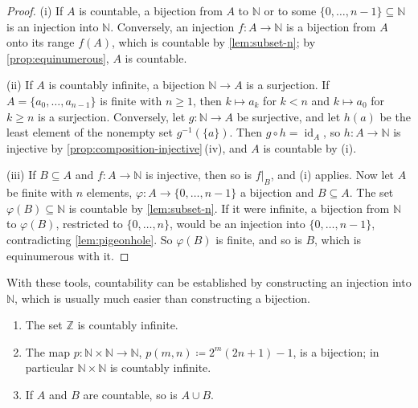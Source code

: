 \begin{proof}
(i) If $A$ is countable, a bijection from $A$ to $\mathbb N$ or to some $\{0,\ldots,n-1\}\subseteq\mathbb N$ is an injection into $\mathbb N$. Conversely, an injection $f\colon A\to\mathbb N$ is a bijection from $A$ onto its range $f(A)$, which is countable by \cref{lem:subset-n}; by \cref{prop:equinumerous}, $A$ is countable.

(ii) If $A$ is countably infinite, a bijection $\mathbb N\to A$ is a surjection. If $A=\{a_0,\ldots,a_{n-1}\}$ is finite with $n\ge1$, then $k\mapsto a_k$ for $k<n$ and $k\mapsto a_0$ for $k\ge n$ is a surjection. Conversely, let $g\colon\mathbb N\to A$ be surjective, and let $h(a)$ be the least element of the nonempty set $g^{-1}(\{a\})$. Then $g\circ h=\operatorname{id}_A$, so $h\colon A\to\mathbb N$ is injective by \cref{prop:composition-injective}\,(iv), and $A$ is countable by (i).

(iii) If $B\subseteq A$ and $f\colon A\to\mathbb N$ is injective, then so is $f|_B$, and (i) applies. Now let $A$ be finite with $n$ elements, $\varphi\colon A\to\{0,\ldots,n-1\}$ a bijection and $B\subseteq A$. The set $\varphi(B)\subseteq\mathbb N$ is countable by \cref{lem:subset-n}. If it were infinite, a bijection from $\mathbb N$ to $\varphi(B)$, restricted to $\{0,\ldots,n\}$, would be an injection into $\{0,\ldots,n-1\}$, contradicting \cref{lem:pigeonhole}. So $\varphi(B)$ is finite, and so is $B$, which is equinumerous with it.
\end{proof}

With these tools, countability can be established by constructing an injection into $\mathbb N$, which is usually much easier than constructing a bijection.

\begin{proposition}
\label{prop:countable-examples}
\leavevmode
\begin{enumerate}
\item The set $\mathbb Z$ is countably infinite.
\item The map $p\colon\mathbb N\times\mathbb N\to\mathbb N$, $p(m,n)\coloneqq2^m(2n+1)-1$, is a bijection; in particular $\mathbb N\times\mathbb N$ is countably infinite.
\item If $A$ and $B$ are countable, so is $A\cup B$.
\end{enumerate}
\end{proposition}


